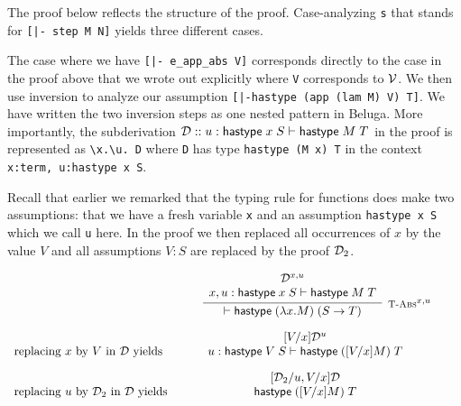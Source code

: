 The proof below reflects the structure of the proof.
Case-analyzing \lstinline!s! that stands for
\lstinline![|- step M N]! yields three different cases.

The case where
we have  \lstinline![|- e_app_abs V]!
corresponds directly to the case in the proof above that we
wrote out explicitly where \lstinline!V! corresponds to ${\mathcal{V}}$. We then
use inversion to analyze our assumption
\lstinline![|-hastype (app (lam M) V) T]!. We have written the two
inversion steps as one nested pattern in Beluga. More importantly, the
subderivation $\mathbin{{\mathcal{D}} :: u:\mathsf{hastype}\;x\;S \vdash \mathsf{hastype}\;M\;T }$ in the proof is represented as
\lstinline!\x.\u. D! where
\lstinline!D! has type \lstinline!hastype (M x) T! in the context \lstinline!x:term, u:hastype x S!.

Recall that earlier we remarked that the
typing rule for functions does make two assumptions: that we have a
fresh variable \lstinline!x! and an assumption \lstinline!hastype x S!
which we call \lstinline!u! here. In the proof we then replaced all
occurrences of $x$ by the value $V$ and all assumptions $V:S$ are
replaced by the proof ${\mathcal{D}}_2$.

\begin{small}

\[
\begin{array}{l@{\quad}c@{\quad}l@{\quad}c}
& \qquad\infer[\TFn^{x,u}]
       {\vdash \tmhastype {(\lam x. M)}{(S \arrow T)}}
       {\above{\D^{x,u}}{x, u:\tmhastype x S \vdash \tmhastype M T}} & & \\[1em]
\mbox{replacing $x$ by $V$ in $\D$ yields} &
       {\above{[V/x]\D^u}{u:\tmhastype V S \vdash \tmhastype {([V/x]M)} T}} & \\[1em]
\mbox{replacing $u$ by $\D_2$ in $\D$ yields} &
\above{[\D_2/u, V/x]\D}{\tmhastype {([V/x]M)} T}
\end{array}
\]

\end{small}

